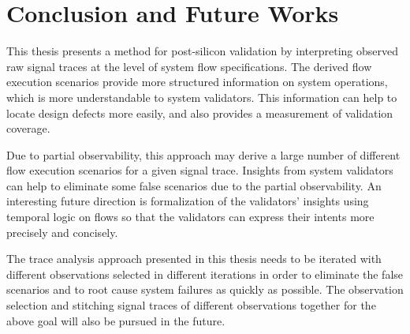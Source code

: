 \documentclass[12pt,frontmatter,copyright,thesis]{usfmanus}
\begin{document}
\chapter{Conclusion and Future Works}
This thesis presents a method for post-silicon validation by
interpreting observed raw signal traces at the level of
system flow specifications.  The derived flow execution
scenarios provide more structured information on system
operations, which is more understandable to system
validators.  This information can help to locate design
defects more easily, and also provides a measurement of
validation coverage.

Due to partial observability, this approach may derive a
large number of different flow execution scenarios for a
given signal trace.  Insights from system validators can
help to eliminate some false scenarios due to the partial
observability.  An interesting future direction is
formalization of the validators' insights using temporal
logic on flows so that the validators can express their
intents more precisely and concisely.

The trace analysis approach presented in this thesis needs to
be iterated with different observations selected in
different iterations in order to eliminate the false
scenarios and to root cause system failures as quickly as
possible.  The observation selection and stitching signal
traces of different observations together for the above goal
will also be pursued in the future.
\end{document}
